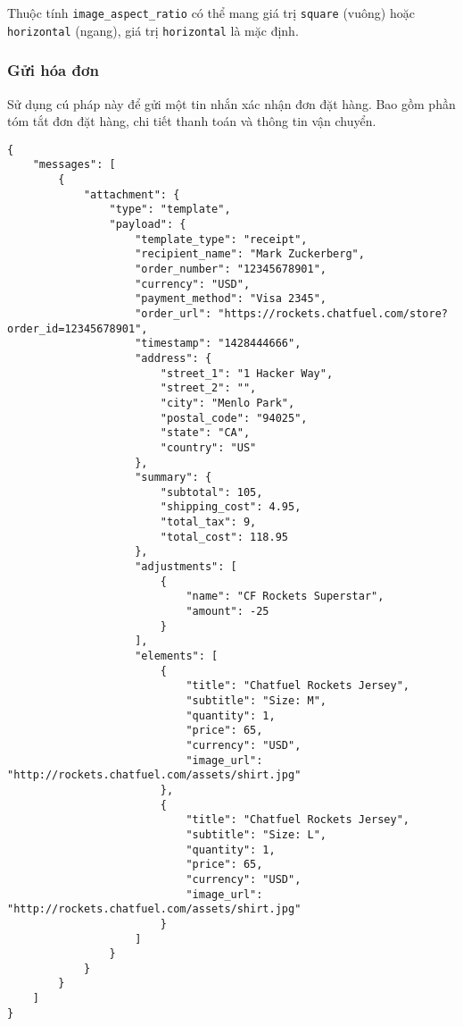 Thuộc tính \texttt{image\_aspect\_ratio} có thể mang giá trị \texttt{square} (vuông) hoặc \texttt{horizontal} (ngang), giá trị \texttt{horizontal} là mặc định.\par

\subsubsection{Gửi hóa đơn}
Sử dụng cú pháp này để gửi một tin nhắn xác nhận đơn đặt hàng. Bao gồm phần tóm tắt đơn đặt hàng, chi tiết thanh toán và thông tin vận chuyển.
\begin{lstlisting}
{
	"messages": [
		{
			"attachment": {
				"type": "template",
				"payload": {
					"template_type": "receipt",
					"recipient_name": "Mark Zuckerberg",
					"order_number": "12345678901",
					"currency": "USD",
					"payment_method": "Visa 2345",
					"order_url": "https://rockets.chatfuel.com/store?order_id=12345678901",
					"timestamp": "1428444666",
					"address": {
						"street_1": "1 Hacker Way",
						"street_2": "",
						"city": "Menlo Park",
						"postal_code": "94025",
						"state": "CA",
						"country": "US"
					},
					"summary": {
						"subtotal": 105,
						"shipping_cost": 4.95,
						"total_tax": 9,
						"total_cost": 118.95
					},
					"adjustments": [
						{
							"name": "CF Rockets Superstar",
							"amount": -25
						}
					],
					"elements": [
						{
							"title": "Chatfuel Rockets Jersey",
							"subtitle": "Size: M",
							"quantity": 1,
							"price": 65,
							"currency": "USD",
							"image_url": "http://rockets.chatfuel.com/assets/shirt.jpg"
						},
						{
							"title": "Chatfuel Rockets Jersey",
							"subtitle": "Size: L",
							"quantity": 1,
							"price": 65,
							"currency": "USD",
							"image_url": "http://rockets.chatfuel.com/assets/shirt.jpg"
						}
					]
				}
			}
		}
	]
}
\end{lstlisting}
